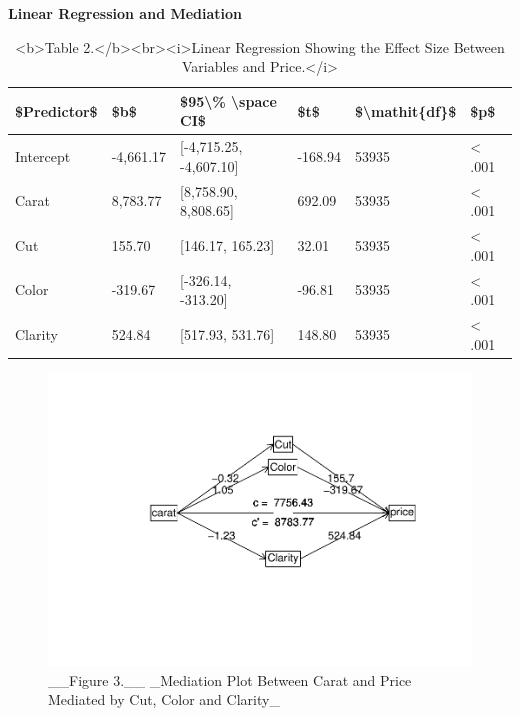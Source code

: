 \documentclass[
]{article}
\begin{document}
\hfill\break
\textbf{Linear Regression and Mediation}

\begin{table}

\caption{\label{tab:lr table}<b>Table 2.</b><br><i>Linear Regression Showing the Effect Size Between Variables and Price.</i>}
\centering
\begin{tabular}[t]{llllll}
\toprule
\$Predictor\$ & \$b\$ & \$95\textbackslash{}\% \textbackslash{}space CI\$ & \$t\$ & \$\textbackslash{}mathit\{df\}\$ & \$p\$\\
\midrule
Intercept & -4,661.17 & {}[-4,715.25, -4,607.10] & -168.94 & 53935 & < .001\\
Carat & 8,783.77 & {}[8,758.90, 8,808.65] & 692.09 & 53935 & < .001\\
Cut & 155.70 & {}[146.17, 165.23] & 32.01 & 53935 & < .001\\
Color & -319.67 & {}[-326.14, -313.20] & -96.81 & 53935 & < .001\\
Clarity & 524.84 & {}[517.93, 531.76] & 148.80 & 53935 & < .001\\
\bottomrule
\end{tabular}
\end{table}

\begin{figure}

{\centering \includegraphics{diamonds_files/figure-latex/med calc-1} 

}

\caption{__Figure 3.__ _Mediation Plot Between Carat and Price Mediated by Cut, Color and Clarity_}\label{fig:med calc}
\end{figure}
\end{document}
